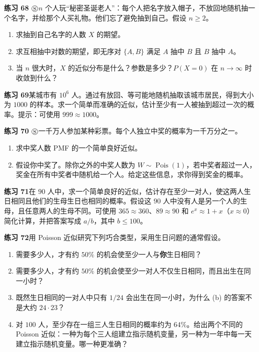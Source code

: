 \documentclass[UTF8,12pt,a4paper,fontset=fandol]{ctexart}
\begin{document}
\noindent\textbf{练习 68 $\circledS$}\quad $n$ 个人玩“秘密圣诞老人”：每个人把名字放入帽子，不放回地随机抽一个名字，并给那个人买礼物。他们忘了避免抽到自己。假设 $n\ge2$。
\begin{enumerate}
  \item[(a)] 求抽到自己名字的人数 $X$ 的期望。
  \item[(b)] 求互相抽中对数的期望，即无序对 $\{A,B\}$ 满足 $A$ 抽中 $B$ 且 $B$ 抽中 $A$。
  \item[(c)] 当 $n$ 很大时，$X$ 的近似分布是什么？参数是多少？$P(X=0)$ 在 $n\to\infty$ 时收敛到什么？
\end{enumerate}

\noindent\textbf{练习 69}\quad 某城市有 $10^6$ 人。通过有放回、等可能地随机抽取该城市居民，得到大小为 $1000$ 的样本。求一个简单而准确的近似，估计至少有一人被抽到超过一次的概率。提示：可使用 $999\approx 1000$。

\noindent\textbf{练习 70 $\circledS$}\quad 一千万人参加某种彩票。每个人独立中奖的概率为一千万分之一。
\begin{enumerate}
  \item[(a)] 求中奖人数 PMF 的一个简单良好近似。
  \item[(b)] 假设你中奖了。除你之外的中奖人数为 $W\sim\operatorname{Pois}(1)$，若中奖者超过一人，奖金在所有中奖者中随机给一个人。给定这些信息，求你得到奖金的概率。
\end{enumerate}

\noindent\textbf{练习 71}\quad 在 $90$ 人中，求一个简单良好的近似，估计存在至少一对人，使这两人生日相同且他们的生母生日也相同的概率。假设这 $90$ 人中没有人是另一个人的生母，且任意两人的生母不同。可使用 $365\approx 360$、$89\approx90$ 和 $e^x\approx1+x$（$x\approx0$）简化计算，并把答案写成 $a/b$，其中 $b\le100$。

\noindent\textbf{练习 72}\quad 用 Poisson 近似研究下列巧合类型，采用生日问题的通常假设。
\begin{enumerate}
  \item[(a)] 需要多少人，才有约 $50\%$ 的机会使至少一人与\textbf{你}生日相同？
  \item[(b)] 需要多少人，才有约 $50\%$ 的机会使至少一对人不仅生日相同，而且出生在同一小时？
  \item[(c)] 既然生日相同的一对人中只有 $1/24$ 会出生在同一小时，为什么 (b) 的答案不是大约 $24\cdot 23$？
  \item[(d)] 对 $100$ 人，至少存在一组三人生日相同的概率约为 $64\%$。给出两个不同的 Poisson 近似：一种为每个三人组建立指示随机变量，另一种为一年中每一天建立指示随机变量。哪一种更准确？
\end{enumerate}
\end{document}
